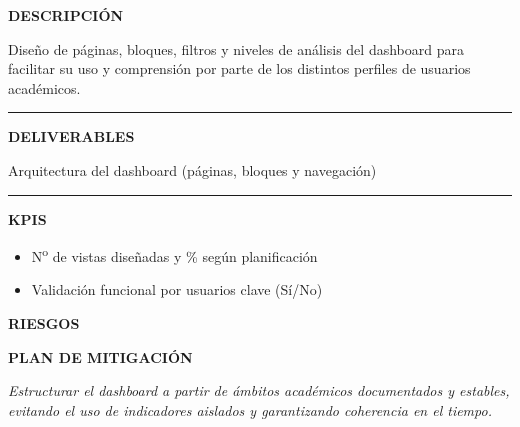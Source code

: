 \documentclass[11pt,a4paper]{scrreprt}
\newcommand{\fieldlabel}[1]{%
  {\footnotesize\sffamily\bfseries\color{mutedcolor}\MakeUppercase{#1}}\par\nopagebreak[4]
}
\newcommand{\fieldsep}{\vspace{3pt}\noindent\textcolor{bordercolor}{\rule{\linewidth}{0.4pt}}\vspace{3pt}\par}
\begin{document}
\begin{tcolorbox}[pabox={dashcolor}{PA1.2 \enspace\textbullet\enspace Diseño de la estructura funcional del dashboard}]

\fieldlabel{Descripci\'on}
{\small Diseño de páginas, bloques, filtros y niveles de análisis del dashboard para facilitar su uso y comprensión por parte de los distintos perfiles de usuarios académicos.}\par
\fieldsep
\fieldlabel{Deliverables}
{\small Arquitectura del dashboard (páginas, bloques y navegación)}\par
\fieldsep
\fieldlabel{KPIs}
{\small \begin{itemize}[noitemsep,topsep=2pt]
\item N\textsuperscript{o} de vistas diseñadas y \% según planificación
\item Validación funcional por usuarios clave (Sí/No)
\end{itemize}}\par
\end{tcolorbox}
\begin{tcolorbox}[riskbox]
{\footnotesize\sffamily\bfseries\color{red!50!black} RIESGOS}\par{}
\end{tcolorbox}
\begin{tcolorbox}[mitbox]
{\footnotesize\sffamily\bfseries\color{green!40!black} PLAN DE MITIGACI\'ON}\par{}
\end{tcolorbox}
\vspace{8pt}

\newpage
{}
{\small\color{mutedcolor}\itshape Estructurar el dashboard a partir de ámbitos académicos documentados y estables, evitando el uso de indicadores aislados y garantizando coherencia en el tiempo.}\par\vspace{6pt}
\end{document}
